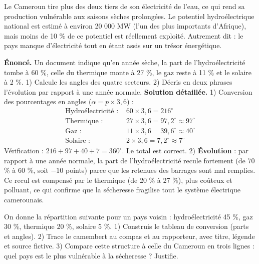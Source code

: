 \documentclass[11pt]{article}
\newcounter{popsec}
\newcounter{popsub}
\newcommand{\courssub}[1]{%
  \stepcounter{popsub}%
  \par\vspace{9pt}\noindent{\popxbold\fontsize{11.5}{13}\selectfont\color{popink}{\color{poporange}\thepopsec.\thepopsub}\hspace{6pt}#1}\par\nopagebreak\vspace{4pt}
}
\begin{document}
\begin{savaistu}
Le Cameroun tire plus des deux tiers de son électricité de l'eau, ce qui rend sa production vulnérable aux saisons sèches prolongées. Le potentiel hydroélectrique national est estimé à environ 20 000 MW (l'un des plus importants d'Afrique), mais moins de 10 \% de ce potentiel est réellement exploité. Autrement dit : le pays manque d'électricité tout en étant assis sur un trésor énergétique.
\end{savaistu}

\courssub{Exercice résolu et conclusion du TP}

\begin{exoresolu}
\textbf{Énoncé.} Un document indique qu'en année sèche, la part de l'hydroélectricité tombe à 60 \%, celle du thermique monte à 27 \%, le gaz reste à 11 \% et le solaire à 2 \%. 1) Calcule les angles des quatre secteurs. 2) Décris en deux phrases l'évolution par rapport à une année normale.
\tcblower
\textbf{Solution détaillée.}
1) Conversion des pourcentages en angles ($\alpha = p \times 3{,}6$) :
\begin{align*}
\text{Hydroélectricité : } & 60 \times 3{,}6 = 216^{\circ} \\
\text{Thermique : } & 27 \times 3{,}6 = 97{,}2^{\circ} \approx 97^{\circ} \\
\text{Gaz : } & 11 \times 3{,}6 = 39{,}6^{\circ} \approx 40^{\circ} \\
\text{Solaire : } & 2 \times 3{,}6 = 7{,}2^{\circ} \approx 7^{\circ}
\end{align*}
Vérification : $216 + 97 + 40 + 7 = 360^{\circ}$. Le total est correct.
2) \textbf{Évolution} : par rapport à une année normale, la part de l'hydroélectricité recule fortement (de 70 \% à 60 \%, soit $-10$ points) parce que les retenues des barrages sont mal remplies. Ce recul est compensé par le thermique (de 20 \% à 27 \%), plus coûteux et polluant, ce qui confirme que la sécheresse fragilise tout le système électrique camerounais.
\end{exoresolu}

\begin{exercice}
On donne la répartition suivante pour un pays voisin : hydroélectricité 45 \%, gaz 30 \%, thermique 20 \%, solaire 5 \%. 1) Construis le tableau de conversion (parts et angles). 2) Trace le camembert au compas et au rapporteur, avec titre, légende et source fictive. 3) Compare cette structure à celle du Cameroun en trois lignes : quel pays est le plus vulnérable à la sécheresse ? Justifie.
\end{exercice}
\end{document}
